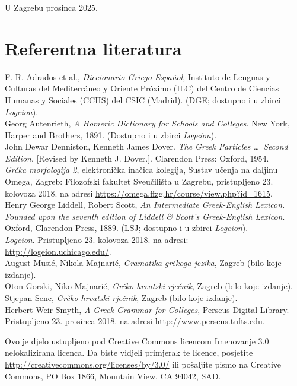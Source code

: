 \documentclass[a4paper,12pt,twoside]{report}
\begin{document}

U Zagrebu prosinca 2025.

\section*{Referentna literatura}

F. R. Adrados et al., \textit{Diccionario Griego-Español}, Instituto de Lenguas y Culturas del Mediterráneo y Oriente Próximo (ILC) del Centro de Ciencias Humanas y Sociales (CCHS) del CSIC (Madrid). (DGE; dostupno i u zbirci \textit{Logeion}).\\
Georg Autenrieth, \textit{A Homeric Dictionary for Schools and Colleges}. New York, Harper and Brothers, 1891. (Dostupno i u zbirci \textit{Logeion}).\\
John Dewar Denniston, Kenneth James Dover. \textit{The Greek Particles \dots\ Second Edition}. [Revised by Kenneth J. Dover.]. Clarendon Press: Oxford, 1954.\\
\textit{Grčka morfologija 2}, elektronička inačica kolegija, Sustav učenja na daljinu Omega, Zagreb: Filozofski fakultet Sveučilišta u Zagrebu, pristupljeno 23. kolovoza 2018. na adresi \url{https://omega.ffzg.hr/course/view.php?id=1615}.\\
Henry George Liddell, Robert Scott, \textit{An Intermediate Greek-English Lexicon. Founded upon the seventh edition of Liddell \& Scott's Greek-English Lexicon}. Oxford, Clarendon Press, 1889. (LSJ; dostupno i u zbirci \textit{Logeion}).\\
\textit{Logeion}. Pristupljeno 23. kolovoza 2018. na adresi: \\ \url{http://logeion.uchicago.edu/}.\\
August Musić, Nikola Majnarić, \textit{Gramatika grčkoga jezika}, Zagreb (bilo koje izdanje).\\
Oton Gorski, Niko Majnarić, \textit{Grčko-hrvatski rječnik}, Zagreb (bilo koje izdanje).\\
Stjepan Senc, \textit{Grčko-hrvatski rječnik}, Zagreb (bilo koje izdanje).\\
Herbert Weir Smyth, \textit{A Greek Grammar for Colleges}, Perseus Digital Library. Pristupljeno 23. prosinca 2018. na adresi \url{http://www.perseus.tufts.edu}.\\

\vspace*{\fill}

\noindent Ovo je djelo ustupljeno pod Creative Commons licencom Imenovanje 3.0 nelokalizirana licenca. Da biste vidjeli primjerak te licence, posjetite \url{http://creativecommons.org/licenses/by/3.0/} ili pošaljite pismo na Creative Commons, PO Box 1866, Mountain View, CA 94042, SAD.
\end{document}

